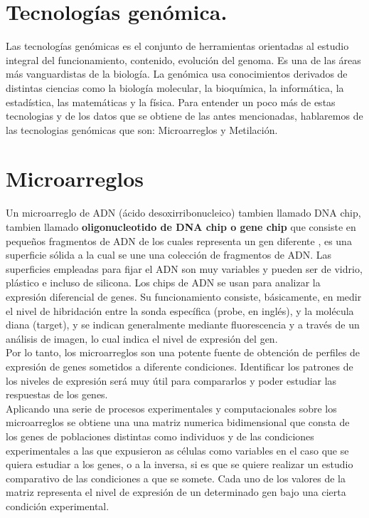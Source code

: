 \documentclass[12pt,letterpaper]{article}
\begin{document}
\section{Tecnologías genómica.}
Las tecnologías genómicas es el conjunto de herramientas orientadas al estudio integral del funcionamiento, contenido,  evolución del genoma. Es una de las áreas más vanguardistas de la biología. La genómica usa conocimientos derivados de distintas ciencias como la biología molecular, la bioquímica, la informática, la estadística, las matemáticas y la física.
Para entender un poco más de estas tecnologias y de los datos que se obtiene de las antes mencionadas, hablaremos de las tecnologias genómicas que son: Microarreglos y Metilación.
\section{Microarreglos}
Un microarreglo de ADN (ácido desoxirribonucleico) tambien llamado DNA chip, tambien llamado \textbf{oligonucleotido de DNA chip o gene chip} que consiste en pequeños fragmentos de ADN de los cuales representa un gen diferente \cite{VallinPlous2007}, es una superficie sólida a la cual se une una colección de fragmentos de ADN. Las superficies empleadas para fijar el ADN son muy variables y pueden ser de vidrio, plástico e incluso de silicona. Los chips de ADN se usan para analizar la expresión diferencial de genes.  Su funcionamiento consiste, básicamente, en medir el nivel de hibridación entre la sonda específica (probe, en inglés), y la molécula diana (target), y se indican generalmente mediante fluorescencia y a través de un análisis de imagen, lo cual indica el nivel de expresión del gen.	\\
Por lo tanto, los microarreglos son una potente fuente de obtención de perfiles de expresión de genes sometidos a diferente condiciones. Identificar los patrones de los niveles de expresión será muy útil para compararlos y poder estudiar las respuestas de los genes. \\
Aplicando una serie de procesos experimentales y computacionales sobre los microarreglos se obtiene una una matriz numerica bidimensional que consta de los genes de poblaciones distintas como individuos y de las condiciones experimentales a las que expusieron as células como variables en el caso que se quiera estudiar a los genes, o a la inversa, si es que se quiere realizar un estudio comparativo de las condiciones a que se somete. Cada uno de los valores de la matriz representa el nivel de expresión de un determinado gen bajo una cierta condición experimental. \\
\end{document}
